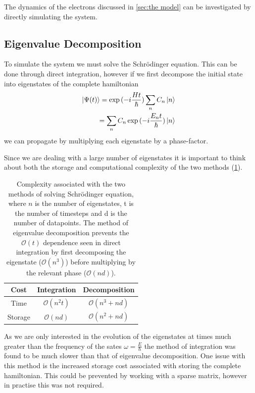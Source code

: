 The dynamics of the electrons
discussed in \cref{sec:the model}
can be investigated by
directly simulating the system.

\subsection{Eigenvalue Decomposition}
To simulate the system we must solve
the Schrödinger equation. This
can be done through direct
integration, however
if we first decompose
the initial state
into eigenstates
of the complete hamiltonian\cite{conduit}
\begin{align}
    \ket{\Psi(t)} = \exp{(-i\frac{Ht}{\hbar})} \sum_n C_n \ket{n} \\
    = \sum_n C_n \exp{(-i\frac{E_n t}{\hbar})} \ket{n}
\end{align}
we can propagate
by multiplying each eigenstate
by a phase-factor.

Since we are dealing with a
large number of eigenstates
it is important to think
about both the storage
and computational complexity
of the two methods (\cref{tab:algorithm complexity}).
\begin{table}[htbp]
    \begin{center}
        \begin{tabular}{ *{3}{c} }
            \toprule
            Cost    & Integration            & Decomposition              \\
            \midrule
            Time    & \(\mathcal{O}(n^2 t)\) & \(\mathcal{O}(n^3 + n d)\) \\
            Storage & \(\mathcal{O}(n d)\)   & \(\mathcal{O}(n^2 + n d)\) \\
            \bottomrule
        \end{tabular}
    \end{center}
    \caption{Complexity associated with the
        two methods of solving Schrödinger equation,
        where \(n\) is the number of eigenstates, t
        is the number of timesteps and d is the
        number of datapoints. The method
        of eigenvalue decomposition
        prevents the \(\mathcal{O}(t)\)
        dependence seen
        in direct integration
        by first decomposing the
        eigenstate (\(\mathcal{O}(n^3)\))
        before multiplying
        by the relevant phase
        (\(\mathcal{O}(nd)\)).
    }\label{tab:algorithm complexity}
\end{table}

As we
are only interested in the
evolution of the eigenstates
at times much greater than
the frequency of the sates
\(\omega = \frac{E}{\hbar}\)
the method of integration
was found to be much
slower than that of eigenvalue
decomposition. One
issue with this method
is the increased storage
cost associated with
storing the complete
hamiltonian. This could
be prevented by
working with a sparse
matrix, however in
practise this
was not required.

